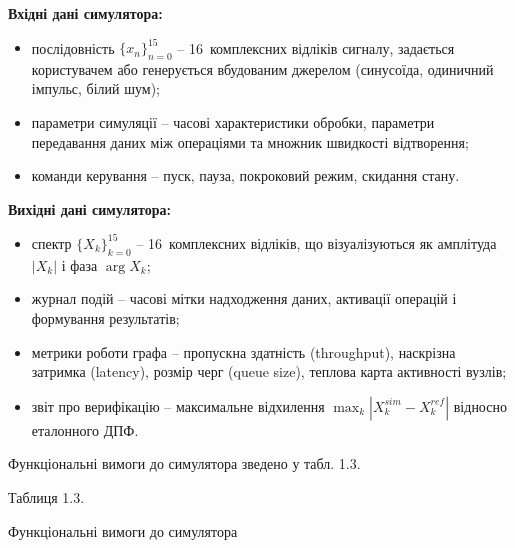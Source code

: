 \documentclass[
]{article}
\begin{document}
\textbf{Вхідні дані симулятора:}

\begin{itemize}
\item
  послідовність \(\{ x_{n}\}_{n = 0}^{15}\) -- 16~комплексних відліків
  сигналу, задається користувачем або генерується вбудованим джерелом
  (синусоїда, одиничний імпульс, білий шум);
\item
  параметри симуляції -- часові характеристики обробки, параметри
  передавання даних між операціями та множник швидкості відтворення;
\item
  команди керування -- пуск, пауза, покроковий режим, скидання стану.
\end{itemize}

\textbf{Вихідні дані симулятора:}

\begin{itemize}
\item
  спектр \(\{ X_{k}\}_{k = 0}^{15}\) -- 16~комплексних відліків, що
  візуалізуються як амплітуда \(|X_{k}|\) і фаза \(\arg X_{k}\);
\item
  журнал подій -- часові мітки надходження даних, активації операцій і
  формування результатів;
\item
  метрики роботи графа -- пропускна здатність (throughput), наскрізна
  затримка (latency), розмір черг (queue size), теплова карта активності
  вузлів;
\item
  звіт про верифікацію -- максимальне відхилення
  \(\max_{k}|X_{k}^{sim} - X_{k}^{ref}|\) відносно еталонного ДПФ.
\end{itemize}

Функціональні вимоги до симулятора зведено у табл. 1.3.

Таблиця 1.3.

Функціональні вимоги до симулятора
\end{document}
